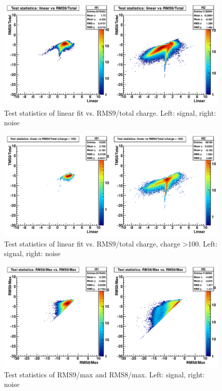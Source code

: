 \begin{figure}
\includegraphics[width=120mm]{DailyLog/6321/6321HTestStatisticsLinearVsRMS9OverTotalCharge.pdf}
\caption{Test statistics of linear fit vs. RMS9/total charge.  Left: signal, right: noise}
\label{Figure_6321HTestStatisticsLinearVsRMS9OverTotalCharge}
\end{figure}

\begin{figure}
\includegraphics[width=120mm]{DailyLog/6321/6321HTestStatisticsLinearVsRMS9OverTotalCharge100.pdf}
\caption{Test statistics of linear fit vs. RMS9/total charge, charge \textgreater 100.  Left: signal, right: noise}
\label{Figure_6321HTestStatisticsLinearVsRMS9OverTotalCharge100}
\end{figure}

\begin{figure}
\includegraphics[width=120mm]{DailyLog/6321/6321HTestStatisticsRMS8OverMaxVsRMS9OverMax.pdf}
\caption{Test statistics of RMS9/max and RMS8/max.  Left: signal, right: noise}
\label{Figure_6321HTestStatisticsRMS8OverMaxVsRMS9OverMax}
\end{figure}


